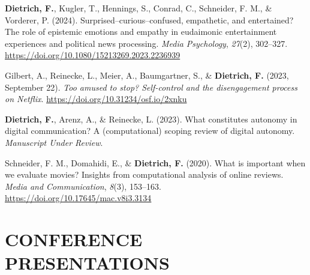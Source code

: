 \documentclass[11pt,a4paper,]{awesome-cv}
\newlength{\cslhangindent}
\newenvironment{CSLReferences}[2] %
 {\begin{list}{}{%
  \setlength{\itemindent}{0pt}
  \setlength{\leftmargin}{0pt}
  \setlength{\parsep}{0pt}
  \ifodd #1
   \setlength{\leftmargin}{\cslhangindent}
   \setlength{\itemindent}{-1\cslhangindent}
  \fi
  \setlength{\itemsep}{#2\baselineskip}}}
 {\end{list}}
\begin{document}
\label{refs-d753fc05d33ace184e583e35b4a5dd39}
\begin{CSLReferences}{1}{0}
\textbf{Dietrich, F.}, Kugler, T., Hennings, S., Conrad, C., Schneider,
F. M., \& Vorderer, P. (2024). Surprised--curious--confused, empathetic,
and entertained? The role of epistemic emotions and empathy in
eudaimonic entertainment experiences and political news processing.
\emph{Media Psychology}, \emph{27}(2), 302--327.
\url{https://doi.org/10.1080/15213269.2023.2236939}

Gilbert, A., Reinecke, L., Meier, A., Baumgartner, S., \&
\textbf{Dietrich, F.} (2023, September 22). \emph{Too amused to stop?
Self-control and the disengagement process on Netflix}.
\url{https://doi.org/10.31234/osf.io/2xnku}

\textbf{Dietrich, F.}, Arenz, A., \& Reinecke, L. (2023). What
constitutes autonomy in digital communication? A (computational) scoping
review of digital autonomy. \emph{Manuscript Under Review}.

Schneider, F. M., Domahidi, E., \& \textbf{Dietrich, F.} (2020). What is
important when we evaluate movies? Insights from computational analysis
of online reviews. \emph{Media and Communication}, \emph{8}(3),
153--163. \url{https://doi.org/10.17645/mac.v8i3.3134}

\end{CSLReferences}

\endgroup

\section{CONFERENCE PRESENTATIONS}\label{conference-presentations}

\begingroup
\vspace{0.6em}
\fontsize{9pt}{1em}\bodyfontlight{}\color{text}
\setlength{\parindent}{-0.5in}
\setlength{\leftskip}{0.5in}
\end{document}
